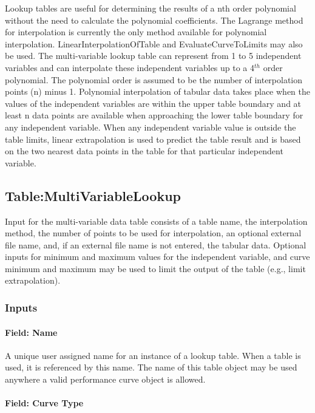 Lookup tables are useful for determining the results of a nth order polynomial without the need to calculate the polynomial coefficients. The Lagrange method for interpolation is currently the only method available for polynomial interpolation. LinearInterpolationOfTable and EvaluateCurveToLimits may also be used. The multi-variable lookup table can represent from 1 to 5 independent variables and can interpolate these independent variables up to a 4\(^{th}\) order polynomial. The polynomial order is assumed to be the number of interpolation points (n) minus 1. Polynomial interpolation of tabular data takes place when the values of the independent variables are within the upper table boundary and at least n data points are available when approaching the lower table boundary for any independent variable. When any independent variable value is outside the table limits, linear extrapolation is used to predict the table result and is based on the two nearest data points in the table for that particular independent variable.

\subsection{Table:MultiVariableLookup}\label{tablemultivariablelookup}

Input for the multi-variable data table consists of a table name, the interpolation method, the number of points to be used for interpolation, an optional external file name, and, if an external file name is not entered, the tabular data. Optional inputs for minimum and maximum values for the independent variable, and curve minimum and maximum may be used to limit the output of the table (e.g., limit extrapolation).

\subsubsection{Inputs}\label{inputs-2-027}

\paragraph{Field: Name}\label{field-name-2-026}

A unique user assigned name for an instance of a lookup table. When a table is used, it is referenced by this name. The name of this table object may be used anywhere a valid performance curve object is allowed.

\paragraph{Field: Curve Type}\label{field-curve-type-2}

